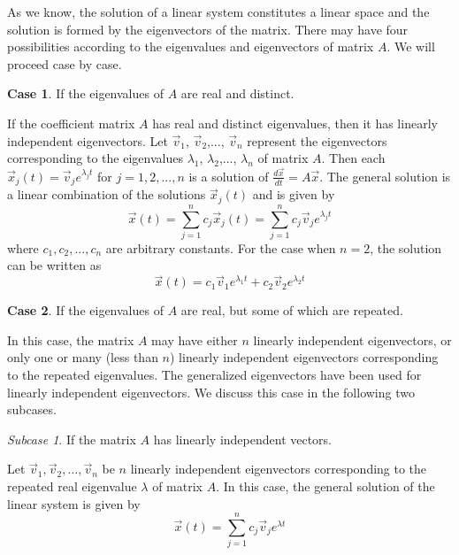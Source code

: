 \documentclass[11pt]{book}
\theoremstyle{definition}\newtheorem{definition}[subsection]{Definition}
\theoremstyle{definition}\newtheorem{example}[subsection]{Example}
\theoremstyle{definition}\newtheorem{notation}[subsection]{Notation}
\theoremstyle{definition}\newtheorem{remark}[subsection]{Remark}
\theoremstyle{theorem}\newtheorem{theorem}[subsection]{Theorem}
\theoremstyle{theorem}\newtheorem{lemma}[subsection]{Lemma}
\theoremstyle{theorem}\newtheorem{proposition}[subsection]{Proposition}
\theoremstyle{theorem}\newtheorem{corollary}[subsection]{Corollary}
\theoremstyle{theorem}\newtheorem{case}{Case}
\theoremstyle{remark}\newtheorem{subcase}{Subcase}[case]
\begin{document}
As we know, the solution of a linear system constitutes a linear space and the solution is formed by the eigenvectors of the matrix. There may have four possibilities according to the eigenvalues and eigenvectors of matrix $A$. We will proceed case by case.

\begin{case}
    If the eigenvalues of $A$ are real and distinct.
\end{case}

If the coefficient matrix $A$ has real and distinct eigenvalues, then it has linearly independent eigenvectors. Let $\vec{v}_1$, $\vec{v}_2$,..., $\vec{v}_n$ represent the eigenvectors corresponding to the eigenvalues $\lambda_1$, $\lambda_2$,..., $\lambda_n$ of matrix $A$. Then each $\vec{x}_j(t) = \vec{v}_je^{\lambda_j t}$ for $j = 1, 2,..., n$ is a solution of $\frac{d\vec{x}}{dt} = A\vec{x}$. The general solution is a linear combination of the solutions $\vec{x}_j(t)$ and is given by
\begin{equation*}
    \vec{x}(t) = \sum_{j = 1}^{n} c_j\vec{x}_j(t) = \sum_{j = 1}^{n} c_j \vec{v}_je^{\lambda_j t}
\end{equation*}
where $c_1, c_2,..., c_n$ are arbitrary constants. For the case when $n = 2$, the solution can be written as
\begin{equation*}
    \vec{x}(t) = c_1\vec{v}_1e^{\lambda_1 t} + c_2\vec{v}_2e^{\lambda_2 t}
\end{equation*}

\begin{case}
    If the eigenvalues of $A$ are real, but some of which are repeated.
\end{case}

In this case, the matrix $A$ may have either $n$ linearly independent eigenvectors, or only one or many (less than $n$) linearly independent eigenvectors corresponding to the repeated eigenvalues. The generalized eigenvectors have been used for linearly independent eigenvectors. We discuss this case in the following two subcases.

\begin{subcase}
    If the matrix $A$ has linearly independent vectors.
\end{subcase}

Let $\vec{v}_1, \vec{v}_2,..., \vec{v}_n$ be $n$ linearly independent eigenvectors corresponding to the repeated real eigenvalue $\lambda$ of matrix $A$. In this case, the general solution of the linear system is given by
\begin{equation*}
    \vec{x}(t) = \sum_{j = 1}^{n} c_j\vec{v}_je^{\lambda t}
\end{equation*}
\end{document}
